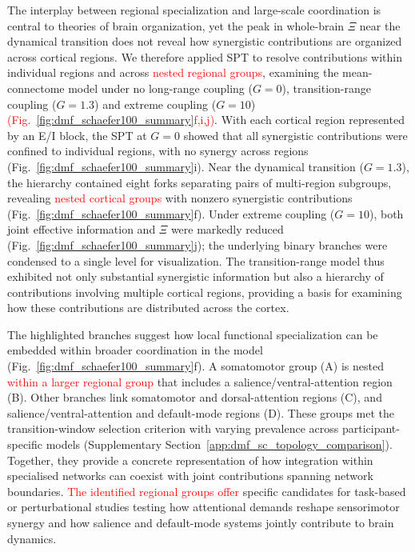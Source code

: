 \documentclass[fleqn,10pt]{wlscirep}
\newcommand{\rev}[1]{\textcolor{red}{#1}}
\theoremstyle{naturetheorem}
\begin{document}
The interplay between regional specialization and large-scale coordination is central to theories of brain organization, yet the peak in whole-brain $\Xi$ near the dynamical transition does not reveal how synergistic contributions are organized across cortical regions. We therefore applied SPT to resolve contributions within individual regions and across %
\rev{nested regional groups}, examining the mean-connectome model under no long-range coupling ($G=0$), transition-range coupling ($G=1.3$) and extreme coupling ($G=10$) \rev{(Fig.~\ref{fig:dmf_schaefer100_summary}f,i,j)}. With each cortical region represented by an E/I block, the SPT at $G=0$ showed that all synergistic contributions were confined to individual regions, with no synergy across regions (Fig.~\ref{fig:dmf_schaefer100_summary}i). Near the dynamical transition ($G=1.3$), the hierarchy contained eight forks separating pairs of multi-region subgroups, revealing %
\rev{nested cortical groups} with nonzero synergistic contributions (Fig.~\ref{fig:dmf_schaefer100_summary}f). Under extreme coupling ($G=10$), both joint effective information and $\Xi$ were markedly reduced (Fig.~\ref{fig:dmf_schaefer100_summary}j); the underlying binary branches were condensed to a single level for visualization. The transition-range model thus exhibited not only substantial synergistic information but also a hierarchy of contributions involving multiple cortical regions, providing a basis for examining how these contributions are distributed across the cortex.

The highlighted branches suggest how local functional specialization can be embedded within broader coordination in the model (Fig.~\ref{fig:dmf_schaefer100_summary}f). A somatomotor group (A) is nested %
\rev{within a larger regional group} that includes a salience/ventral-attention region (B). Other branches link somatomotor and dorsal-attention regions (C), and salience/ventral-attention and default-mode regions (D). These groups met the transition-window selection criterion with varying prevalence across participant-specific models (Supplementary Section~\ref{app:dmf_sc_topology_comparison}). Together, they provide a concrete representation of how integration within specialised networks can coexist with joint contributions spanning network boundaries. %
\rev{The identified regional groups offer} specific candidates for task-based or perturbational studies testing how attentional demands reshape sensorimotor synergy and how salience and default-mode systems jointly contribute to brain dynamics.
\end{document}
